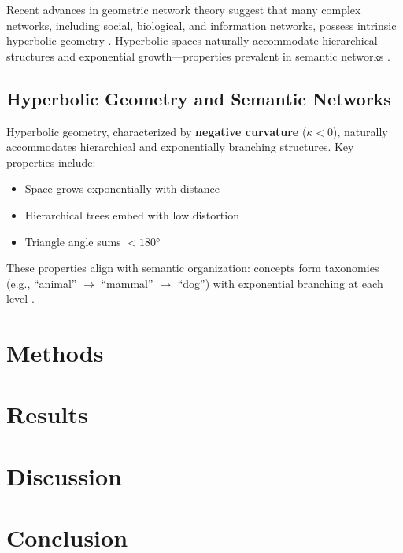 \documentclass[12pt]{article}
\begin{document}
Recent advances in geometric network theory suggest that many complex networks, including social, biological, and information networks, possess intrinsic hyperbolic geometry \citep{krioukov2010, boguna2021, muscoloni2018}. Hyperbolic spaces naturally accommodate hierarchical structures and exponential growth—properties prevalent in semantic networks \citep{barabasi1999}.

\subsection{Hyperbolic Geometry and Semantic Networks}

Hyperbolic geometry, characterized by \textbf{negative curvature} ($\kappa < 0$), naturally accommodates hierarchical and exponentially branching structures. Key properties include:
\begin{itemize}
\item Space grows exponentially with distance
\item Hierarchical trees embed with low distortion
\item Triangle angle sums $< 180°$
\end{itemize}

These properties align with semantic organization: concepts form taxonomies (e.g., ``animal'' $\rightarrow$ ``mammal'' $\rightarrow$ ``dog'') with exponential branching at each level \citep{barabasi1999, watts1998}.



\section{Methods}

\section{Results}

\section{Discussion}

\section{Conclusion}




\end{document}
